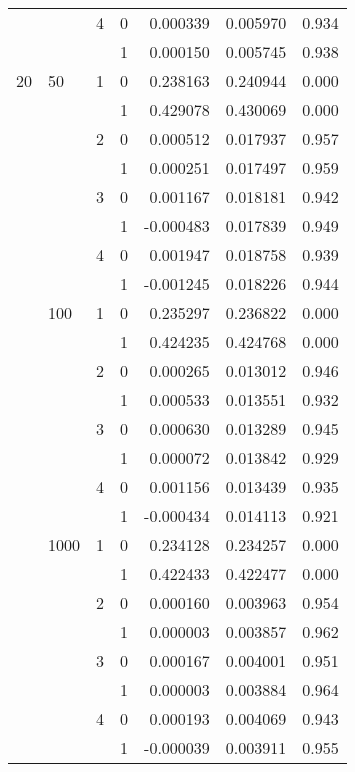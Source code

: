 \begin{tabular}{llllrrr}
   &      & 4 & 0 &  0.000339 &  0.005970 &                 0.934 \\
   &      &   & 1 &  0.000150 &  0.005745 &                 0.938 \\
20 & 50   & 1 & 0 &  0.238163 &  0.240944 &                 0.000 \\
   &      &   & 1 &  0.429078 &  0.430069 &                 0.000 \\
   &      & 2 & 0 &  0.000512 &  0.017937 &                 0.957 \\
   &      &   & 1 &  0.000251 &  0.017497 &                 0.959 \\
   &      & 3 & 0 &  0.001167 &  0.018181 &                 0.942 \\
   &      &   & 1 & -0.000483 &  0.017839 &                 0.949 \\
   &      & 4 & 0 &  0.001947 &  0.018758 &                 0.939 \\
   &      &   & 1 & -0.001245 &  0.018226 &                 0.944 \\
   & 100  & 1 & 0 &  0.235297 &  0.236822 &                 0.000 \\
   &      &   & 1 &  0.424235 &  0.424768 &                 0.000 \\
   &      & 2 & 0 &  0.000265 &  0.013012 &                 0.946 \\
   &      &   & 1 &  0.000533 &  0.013551 &                 0.932 \\
   &      & 3 & 0 &  0.000630 &  0.013289 &                 0.945 \\
   &      &   & 1 &  0.000072 &  0.013842 &                 0.929 \\
   &      & 4 & 0 &  0.001156 &  0.013439 &                 0.935 \\
   &      &   & 1 & -0.000434 &  0.014113 &                 0.921 \\
   & 1000 & 1 & 0 &  0.234128 &  0.234257 &                 0.000 \\
   &      &   & 1 &  0.422433 &  0.422477 &                 0.000 \\
   &      & 2 & 0 &  0.000160 &  0.003963 &                 0.954 \\
   &      &   & 1 &  0.000003 &  0.003857 &                 0.962 \\
   &      & 3 & 0 &  0.000167 &  0.004001 &                 0.951 \\
   &      &   & 1 &  0.000003 &  0.003884 &                 0.964 \\
   &      & 4 & 0 &  0.000193 &  0.004069 &                 0.943 \\
   &      &   & 1 & -0.000039 &  0.003911 &                 0.955 \\
\bottomrule
\end{tabular}
